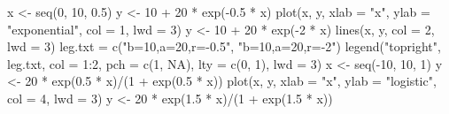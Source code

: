 \documentclass[
  letterpaper,
  DIV=11,
  numbers=noendperiod]{scrreprt}
\newenvironment{Shaded}{\begin{snugshade}}{\end{snugshade}}
\newcommand{\AttributeTok}[1]{\textcolor[rgb]{0.40,0.45,0.13}{#1}}
\newcommand{\ConstantTok}[1]{\textcolor[rgb]{0.56,0.35,0.01}{#1}}
\newcommand{\DecValTok}[1]{\textcolor[rgb]{0.68,0.00,0.00}{#1}}
\newcommand{\FloatTok}[1]{\textcolor[rgb]{0.68,0.00,0.00}{#1}}
\newcommand{\FunctionTok}[1]{\textcolor[rgb]{0.28,0.35,0.67}{#1}}
\newcommand{\NormalTok}[1]{\textcolor[rgb]{0.00,0.23,0.31}{#1}}
\newcommand{\OtherTok}[1]{\textcolor[rgb]{0.00,0.23,0.31}{#1}}
\newcommand{\SpecialCharTok}[1]{\textcolor[rgb]{0.37,0.37,0.37}{#1}}
\newcommand{\StringTok}[1]{\textcolor[rgb]{0.13,0.47,0.30}{#1}}
\begin{document}
\begin{Shaded}
\begin{Highlighting}[]
\NormalTok{x }\OtherTok{\textless{}{-}} \FunctionTok{seq}\NormalTok{(}\DecValTok{0}\NormalTok{, }\DecValTok{10}\NormalTok{, }\FloatTok{0.5}\NormalTok{)}
\NormalTok{y }\OtherTok{\textless{}{-}} \DecValTok{10} \SpecialCharTok{+} \DecValTok{20} \SpecialCharTok{*} \FunctionTok{exp}\NormalTok{(}\SpecialCharTok{{-}}\FloatTok{0.5} \SpecialCharTok{*}\NormalTok{ x)}
\FunctionTok{plot}\NormalTok{(x, y, }\AttributeTok{xlab =} \StringTok{"x"}\NormalTok{, }\AttributeTok{ylab =} \StringTok{"exponential"}\NormalTok{, }\AttributeTok{col =} \DecValTok{1}\NormalTok{, }\AttributeTok{lwd =} \DecValTok{3}\NormalTok{)}
\NormalTok{y }\OtherTok{\textless{}{-}} \DecValTok{10} \SpecialCharTok{+} \DecValTok{20} \SpecialCharTok{*} \FunctionTok{exp}\NormalTok{(}\SpecialCharTok{{-}}\DecValTok{2} \SpecialCharTok{*}\NormalTok{ x)}
\FunctionTok{lines}\NormalTok{(x, y, }\AttributeTok{col =} \DecValTok{2}\NormalTok{, }\AttributeTok{lwd =} \DecValTok{3}\NormalTok{)}
\NormalTok{leg.txt }\OtherTok{=} \FunctionTok{c}\NormalTok{(}\StringTok{"b=10,a=20,r={-}0.5"}\NormalTok{, }\StringTok{"b=10,a=20,r={-}2"}\NormalTok{)}
\FunctionTok{legend}\NormalTok{(}\StringTok{"topright"}\NormalTok{, leg.txt, }\AttributeTok{col =} \DecValTok{1}\SpecialCharTok{:}\DecValTok{2}\NormalTok{, }\AttributeTok{pch =} \FunctionTok{c}\NormalTok{(}\DecValTok{1}\NormalTok{, }\ConstantTok{NA}\NormalTok{), }\AttributeTok{lty =} \FunctionTok{c}\NormalTok{(}\DecValTok{0}\NormalTok{, }\DecValTok{1}\NormalTok{), }\AttributeTok{lwd =} \DecValTok{3}\NormalTok{)}
\NormalTok{x }\OtherTok{\textless{}{-}} \FunctionTok{seq}\NormalTok{(}\SpecialCharTok{{-}}\DecValTok{10}\NormalTok{, }\DecValTok{10}\NormalTok{, }\DecValTok{1}\NormalTok{)}
\NormalTok{y }\OtherTok{\textless{}{-}} \DecValTok{20} \SpecialCharTok{*} \FunctionTok{exp}\NormalTok{(}\FloatTok{0.5} \SpecialCharTok{*}\NormalTok{ x)}\SpecialCharTok{/}\NormalTok{(}\DecValTok{1} \SpecialCharTok{+} \FunctionTok{exp}\NormalTok{(}\FloatTok{0.5} \SpecialCharTok{*}\NormalTok{ x))}
\FunctionTok{plot}\NormalTok{(x, y, }\AttributeTok{xlab =} \StringTok{"x"}\NormalTok{, }\AttributeTok{ylab =} \StringTok{"logistic"}\NormalTok{, }\AttributeTok{col =} \DecValTok{4}\NormalTok{, }\AttributeTok{lwd =} \DecValTok{3}\NormalTok{)}
\NormalTok{y }\OtherTok{\textless{}{-}} \DecValTok{20} \SpecialCharTok{*} \FunctionTok{exp}\NormalTok{(}\FloatTok{1.5} \SpecialCharTok{*}\NormalTok{ x)}\SpecialCharTok{/}\NormalTok{(}\DecValTok{1} \SpecialCharTok{+} \FunctionTok{exp}\NormalTok{(}\FloatTok{1.5} \SpecialCharTok{*}\NormalTok{ x))}

\end{Highlighting}
\end{Shaded}
\end{document}
